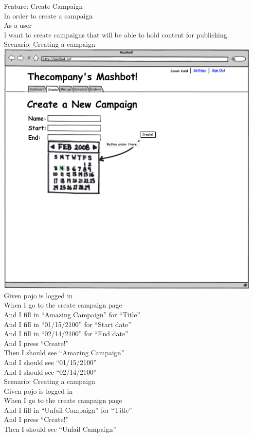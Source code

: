 \documentclass[12pt]{article}
\begin{document}
\begin{hangparas}{0.25in}{1}
Feature: Create Campaign \\
In order to create a campaign \\
As a user \\
I want to create campaigns that will be able to hold content for publishing. \\

Scenario: Creating a campaign \\
\includegraphics[width=\textwidth]{../mockups/create.png}
Given pojo is logged in \\
When I go to the create campaign page \\
And I fill in ``Amazing Campaign'' for ``Title'' \\
And I fill in ``01/15/2100'' for ``Start date'' \\
And I fill in ``02/14/2100'' for ``End date''   \\
And I press ``Create!'' \\
Then I should see ``Amazing Campaign'' \\
And I should see ``01/15/2100'' \\
And I should see ``02/14/2100'' \\

Scenario: Creating a campaign \\
Given pojo is logged in \\
When I go to the create campaign page \\
And I fill in ``Unfail Campaign'' for ``Title'' \\
And I press ``Create!'' \\
Then I should see ``Unfail Campaign'' \\


\end{hangparas}
\end{document}
